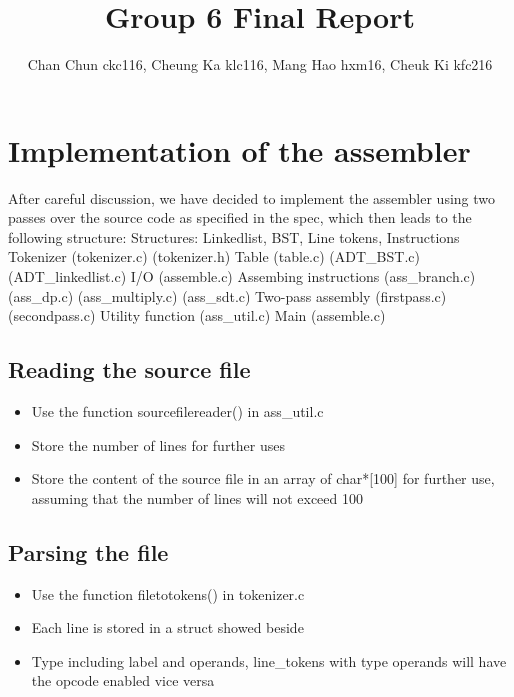 \documentclass[11pt]{article}
\begin{document}
\title{Group 6 Final Report}
\author{Chan Chun ckc116, Cheung Ka klc116, Mang Hao hxm16, Cheuk Ki kfc216}

\maketitle

\section{Implementation of the assembler}

 
After careful discussion, we have decided to implement the assembler using two passes over the source code as specified in the spec, which then leads to the following structure:\newline\newline
Structures:
Linkedlist,
BST,
Line tokens,
Instructions
\newline
Tokenizer
(tokenizer.c)
(tokenizer.h)\newline
Table
(table.c)
(ADT{\_}BST.c)
(ADT{\_}linkedlist.c)\newline
I/O
(assemble.c)\newline
Assembing instructions
(ass{\_}branch.c)
(ass{\_}dp.c)
(ass{\_}multiply.c)
(ass{\_}sdt.c)\newline
Two-pass assembly
(firstpass.c)
(secondpass.c)\newline
Utility function
(ass{\_}util.c)\newline
Main
(assemble.c)

\subsection{Reading the source file}
\begin{itemize}  
\item Use the function sourcefilereader()  in ass{\_}util.c

\item Store the number of lines for further uses 

\item Store the content of the source file in an array of char*[100] for further use, assuming that the number of lines will not exceed 100  

\end{itemize}





\subsection{Parsing the file}
\begin{itemize}  
\item Use the function filetotokens() in tokenizer.c
\item Each line is stored in a struct showed beside
\item Type including label and operands, line{\_}tokens with type operands will have the opcode enabled vice versa
\end{itemize}
\end{document}
